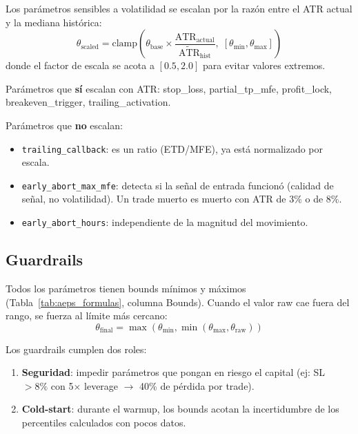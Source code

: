 \documentclass[11pt,a4paper]{article}
\newcommand{\param}[1]{\texttt{\small\color{cpurple}#1}}
\begin{document}
Los par\'ametros sensibles a volatilidad se escalan por la raz\'on
entre el ATR actual y la mediana hist\'orica:
\begin{equation}
\theta_{\text{scaled}} = \text{clamp}\!\left(
  \theta_{\text{base}} \times \frac{\text{ATR}_{\text{actual}}}{\widetilde{\text{ATR}}_{\text{hist}}},
  \; [\theta_{\min}, \theta_{\max}]
\right)
\label{eq:atr_scaling}
\end{equation}
donde el factor de escala se acota a $[0.5, 2.0]$ para evitar
valores extremos.

Par\'ametros que \textbf{s\'i} escalan con ATR: stop\_loss,
partial\_tp\_mfe, profit\_lock, breakeven\_trigger, trailing\_activation.

Par\'ametros que \textbf{no} escalan:
\begin{itemize}[leftmargin=1.5em]
\item \param{trailing\_callback}: es un ratio (ETD/MFE), ya est\'a
  normalizado por escala.
\item \param{early\_abort\_max\_mfe}: detecta si la se\~nal de
  entrada funcion\'o (calidad de se\~nal, no volatilidad).
  Un trade muerto es muerto con ATR de 3\% o de 8\%.
\item \param{early\_abort\_hours}: independiente de la magnitud del
  movimiento.
\end{itemize}


\subsection{Guardrails}
\label{sec:guardrails}

Todos los par\'ametros tienen bounds m\'inimos y m\'aximos
(Tabla~\ref{tab:aeps_formulas}, columna Bounds). Cuando el valor
raw cae fuera del rango, se fuerza al l\'imite m\'as cercano:
\begin{equation}
\theta_{\text{final}} = \max(\theta_{\min}, \min(\theta_{\max}, \theta_{\text{raw}}))
\end{equation}

Los guardrails cumplen dos roles:
\begin{enumerate}[leftmargin=2em]
\item \textbf{Seguridad}: impedir par\'ametros que pongan en riesgo
  el capital (ej: SL $> 8\%$ con 5$\times$ leverage $\to$
  40\% de p\'erdida por trade).
\item \textbf{Cold-start}: durante el warmup, los bounds acotan
  la incertidumbre de los percentiles calculados con pocos datos.
\end{enumerate}
\end{document}
